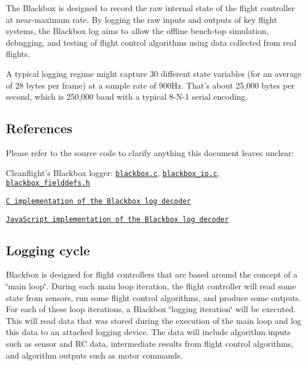 The Blackbox is designed to record the raw internal state of the flight controller at near-\/maximum rate. By logging the raw inputs and outputs of key flight systems, the Blackbox log aims to allow the offline bench-\/top simulation, debugging, and testing of flight control algorithms using data collected from real flights.

A typical logging regime might capture 30 different state variables (for an average of 28 bytes per frame) at a sample rate of 900\+Hz. That's about 25,000 bytes per second, which is 250,000 baud with a typical 8-\/\+N-\/1 serial encoding.

\subsection*{References}

Please refer to the source code to clarify anything this document leaves unclear\+:


\begin{DoxyItemize}
\item Cleanflight's Blackbox logger\+: \href{https://github.com/cleanflight/cleanflight/blob/master/src/main/blackbox/blackbox.c}{\tt blackbox.\+c}, \href{https://github.com/cleanflight/cleanflight/blob/master/src/main/blackbox/blackbox_io.c}{\tt blackbox\+\_\+io.\+c}, \href{https://github.com/cleanflight/cleanflight/blob/master/src/main/blackbox/blackbox_fielddefs.h}{\tt blackbox\+\_\+fielddefs.\+h}
\item \href{https://github.com/cleanflight/blackbox-tools/blob/master/src/parser.c}{\tt C implementation of the Blackbox log decoder}
\item \href{https://github.com/cleanflight/blackbox-log-viewer/blob/master/js/flightlog_parser.js}{\tt Java\+Script implementation of the Blackbox log decoder}
\end{DoxyItemize}

\subsection*{Logging cycle}

Blackbox is designed for flight controllers that are based around the concept of a \char`\"{}main loop\char`\"{}. During each main loop iteration, the flight controller will read some state from sensors, run some flight control algorithms, and produce some outputs. For each of these loop iterations, a Blackbox \char`\"{}logging iteration\char`\"{} will be executed. This will read data that was stored during the execution of the main loop and log this data to an attached logging device. The data will include algorithm inputs such as sensor and R\+C data, intermediate results from flight control algorithms, and algorithm outputs such as motor commands.

